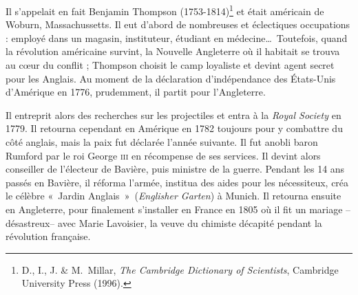 \atstartofhistorysection
{}
\label{ch_histoire_rumford_depondt}


	Il s'appelait en fait Benjamin Thompson (1753-1814)\footnote{D., I., J. \& M.~Millar, \textit{The Cambridge Dictionary of Scientists}, Cambridge University Press (1996).} et était américain de Woburn, Massachussetts. Il eut d'abord de nombreuses et éclectiques occupations : employé dans un magasin, instituteur, étudiant en médecine…\ Toutefois, quand la révolution américaine survint, la Nouvelle Angleterre où il habitait se trouva au cœur du conflit ; Thompson choisit le camp loyaliste et devint agent secret pour les Anglais. Au moment de la déclaration d'indépendance des États-Unis d'Amérique en 1776, prudemment, il partit pour l'Angleterre. 

	Il entreprit alors des recherches sur les projectiles et entra à la \textit{Royal Society} en 1779. Il retourna cependant en Amérique en 1782 toujours pour y combattre du côté anglais, mais la paix fut déclarée l'année suivante. Il fut anobli baron Rumford par le roi George \textsc{iii} en récompense de ses services. Il devint alors conseiller de l'électeur de Bavière, puis ministre de la guerre. Pendant les 14 ans passés en Bavière, il réforma l'armée, institua des aides pour les nécessiteux, créa le célèbre «~Jardin Anglais~»\ (\textit{Englisher Garten}) à Munich. Il retourna ensuite en Angleterre, pour finalement s'installer en France en 1805 où il fit un mariage --désastreux-- avec Marie Lavoisier, la veuve du chimiste décapité pendant la révolution française. 

